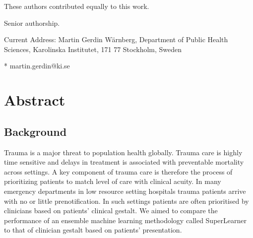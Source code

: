 \documentclass[10pt,letterpaper]{article}\usepackage[]{graphicx}\usepackage[]{color}
\begin{document}
\begin{flushleft}
% 
%
\Yinyang These authors contributed equally to this work.

\ddag Senior authorship.

\textcurrency Current Address: Martin Gerdin Wärnberg, Department of Public
Health Sciences, Karolinska Institutet, 171 77 Stockholm, Sweden




* martin.gerdin@ki.se

\end{flushleft}
\section*{Abstract}
\subsection*{Background}
Trauma is a major threat to population health globally. Trauma care is highly
time sensitive and delays in treatment is associated with preventable mortality
across settings. A key component of trauma care is therefore the process of
prioritizing patients to match level of care with clinical acuity. In many
emergency departments in low resource setting hospitals trauma patients arrive
with no or little prenotification. In such settings patients are often
prioritised by clinicians based on patients' clinical gestalt. We aimed to
compare the performance of an ensemble machine learning methodology called
SuperLearner to that of clinician gestalt based on patients’ presentation.
\end{document}
